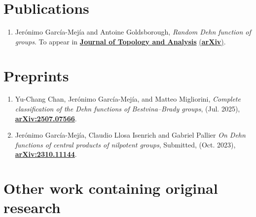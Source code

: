 \documentclass[a4paper,11pt]{article} %
\begin{document}

\section{Publications}

\begin{minipage}{15cm}
\begin{enumerate}[align=right, itemsep=.5em, leftmargin=1.8em]
	
	\item Jerónimo García-Mejía and Antoine Goldsborough, \emph{Random Dehn function of groups}. To appear in {\href{https://doi.org/10.1142/S179352532550027X}{\textbf{Journal of Topology and Analysis}}} {\href{https://arxiv.org/abs/2411.12715}{(\textbf{arXiv})}}.
    
\end{enumerate}
\end{minipage}

\section{Preprints}

\begin{minipage}{15cm}
\begin{enumerate}[align=right, itemsep=.5em, leftmargin=1.8em]
	
	\item Yu-Chang Chan, Jerónimo García-Mejía, and Matteo Migliorini, \emph{Complete classification of the Dehn functions of Bestvina--Brady groups}, (Jul. 2025), {\href{https://arxiv.org/abs/2507.07566}{\textbf{arXiv:2507.07566}}}.
    
    \item Jerónimo García-Mejía, Claudio Llosa Isenrich and Gabriel Pallier \emph{On Dehn functions of central products of nilpotent groups}, Submitted,  (Oct. 2023), {\href{https://arxiv.org/abs/2310.11144}{\textbf{arXiv:2310.11144}}}.
    
\end{enumerate}
\end{minipage}

\section{Other work containing original research}
\end{document}
